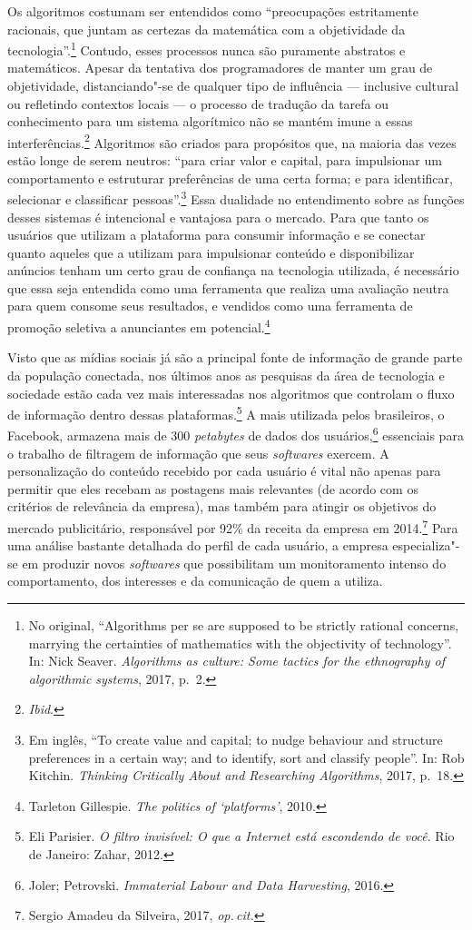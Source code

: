 Os algoritmos costumam ser entendidos como ``preocupações estritamente
racionais, que juntam as certezas da matemática com a objetividade da
tecnologia''.\footnote{No original, ``Algorithms per se are supposed to be strictly
  rational concerns, marrying the certainties of mathematics with the
  objectivity of technology''. In: Nick Seaver. \emph{Algorithms as culture: Some tactics for the
ethnography of algorithmic systems}, 2017, p.\, 2.}
Contudo, esses processos nunca são puramente abstratos e matemáticos.
Apesar da tentativa dos programadores de manter um grau de objetividade,
distanciando"-se de qualquer tipo de influência --- inclusive cultural ou
refletindo contextos locais --- o processo de tradução da tarefa ou
conhecimento para um sistema algorítmico não se mantém imune a essas
interferências.\footnote{\textit{Ibid}.} Algoritmos são criados para propósitos que, na
maioria das vezes estão longe de serem neutros: ``para criar valor e
capital, para impulsionar um comportamento e estruturar preferências de
uma certa forma; e para identificar, selecionar e classificar
pessoas''.\footnote{Em inglês, ``To create value and capital; to nudge behaviour and structure preferences in a certain way; and to identify, sort and classify people''. In: Rob Kitchin. \emph{Thinking Critically About and Researching
Algorithms}, 2017, p.\, 18.} Essa dualidade no
entendimento sobre as funções desses sistemas é intencional e vantajosa
para o mercado. Para que tanto os usuários que utilizam a plataforma
para consumir informação e se conectar quanto aqueles que a utilizam
para impulsionar conteúdo e disponibilizar anúncios tenham um certo grau
de confiança na tecnologia utilizada, é necessário que essa seja
entendida como uma ferramenta que realiza uma avaliação neutra para quem
consome seus resultados, e vendidos como uma ferramenta de promoção
seletiva a anunciantes em potencial.\footnote{Tarleton Gillespie. \emph{The politics of `platforms'}, 2010.}

Visto que as mídias sociais já são a principal fonte de informação de
grande parte da população conectada, nos últimos anos as pesquisas da
área de tecnologia e sociedade estão cada vez mais interessadas nos
algoritmos que controlam o fluxo de informação dentro dessas plataformas.\footnote{Eli Parisier. \emph{O filtro invisível: O que a Internet está escondendo
de você}. Rio de Janeiro: Zahar, 2012.}
A mais utilizada pelos brasileiros, o Facebook,
armazena mais de 300 \emph{petabytes} de dados dos usuários,\footnote{Joler; Petrovski. \emph{Immaterial Labour and Data Harvesting}, 2016.}
essenciais para o trabalho de filtragem de informação que seus \emph{softwares} exercem. A personalização do conteúdo recebido por cada usuário é vital
não apenas para permitir que eles recebam as postagens mais relevantes
(de acordo com os critérios de relevância da empresa), mas também para
atingir os objetivos do mercado publicitário, responsável por 92\% da
receita da empresa em 2014.\footnote{Sergio Amadeu da Silveira, 2017, \textit{op.\,cit.}} Para uma análise bastante
detalhada do perfil de cada usuário, a empresa especializa"-se em
produzir novos \emph{softwares} que possibilitam um monitoramento intenso do
comportamento, dos interesses e da comunicação de quem a utiliza.

